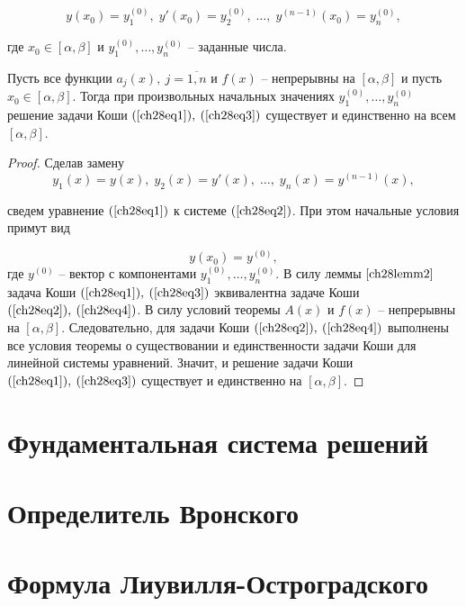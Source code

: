\begin{equation} \label{ch28eq3}
y(x_0) = y_1^{(0)}, \; y'(x_0) = y_2^{(0)}, \; \ldots, \; y^{(n - 1)}(x_0) = y_n^{(0)},
\end{equation}

где $x_0 \in [\alpha, \beta]$ и $y_1^{(0)}, \ldots, y_n^{(0)}$ -- заданные числа.

\begin{thm}
Пусть все функции $a_j(x), \: j = \overline{1,n}$ и $f(x)$ -- непрерывны на $[\alpha, \beta]$ и пусть $x_0 \in [\alpha, \beta]$. Тогда при произвольных начальных значениях $y_1^{(0)}, \ldots, y_n^{(0)}$ решение задачи Коши $(\ref{ch28eq1}), \: (\ref{ch28eq3})$ существует и единственно на всем $[\alpha, \beta]$.
\end{thm}

\begin{proof}
Сделав замену 
$$
y_1(x) = y(x), \; y_2(x) = y'(x), \; \ldots, \; y_n(x) = y^{(n - 1)}(x),
$$

сведем уравнение $(\ref{ch28eq1})$ к системе $(\ref{ch28eq2})$. При этом начальные условия примут вид

\begin{equation} \label{ch28eq4}
y(x_0) = y^{(0)},
\end{equation}
где $y^{(0)}$ -- вектор с компонентами $y_1^{(0)}, \ldots, y_n^{(0)}$. В силу леммы $\ref{ch28lemm2}$ задача Коши $(\ref{ch28eq1}), \: (\ref{ch28eq3})$ эквивалентна задаче Коши $(\ref{ch28eq2}), \: (\ref{ch28eq4})$. В силу условий теоремы $A(x)$ и $f(x)$ -- непрерывны на $[\alpha, \beta]$. Следовательно, для задачи Коши $(\ref{ch28eq2}), \: (\ref{ch28eq4})$ выполнены все условия теоремы о существовании и единственности задачи Коши для линейной системы уравнений. Значит, и решение задачи Коши $(\ref{ch28eq1}), \: (\ref{ch28eq3})$ существует и единственно на $[\alpha, \beta]$.
\end{proof}
\section{Фундаментальная система решений}
\section{Определитель Вронского}
\section{Формула Лиувилля-Остроградского}